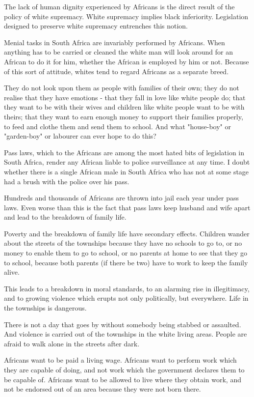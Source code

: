 \documentclass[11pt,a4paper]{article}
\begin{document}
The lack of human dignity experienced by Africans is the direct result of the policy of white
supremacy. White supremacy implies black inferiority. Legislation designed to preserve
white supremacy entrenches this notion.

Menial tasks in South Africa are invariably performed by Africans. When anything has to
be carried or cleaned the white man will look around for an African to do it for him, whether
the African is employed by him or not. Because of this sort of attitude, whites tend to
regard Africans as a separate breed.

They do not look upon them as people with families of their own; they do not realise that
they have emotions - that they fall in love like white people do; that they want to be with
their wives and children like white people want to be with theirs; that they want to earn
enough money to support their families properly, to feed and clothe them and send them to
school. And what "house-boy" or "garden-boy" or labourer can ever hope to do this?

Pass laws, which to the Africans are among the most hated bits of legislation in South
Africa, render any African liable to police surveillance at any time. I doubt whether there is
a single African male in South Africa who has not at some stage had a brush with the
police over his pass.

Hundreds and thousands of Africans are thrown into jail each year under pass laws. Even
worse than this is the fact that pass laws keep husband and wife apart and lead to the
breakdown of family life.

Poverty and the breakdown of family life have secondary effects. Children wander about
the streets of the townships because they have no schools to go to, or no money to enable
them to go to school, or no parents at home to see that they go to school, because both
parents (if there be two) have to work to keep the family alive.

This leads to a breakdown in moral standards, to an alarming rise in illegitimacy, and to
growing violence which erupts not only politically, but everywhere. Life in the townships is
dangerous.

There is not a day that goes by without somebody being stabbed or assaulted. And
violence is carried out of the townships in the white living areas. People are afraid to walk
alone in the streets after dark.

Africans want to be paid a living wage. Africans want to perform work which they are
capable of doing, and not work which the government declares them to be capable of.
Africans want to be allowed to live where they obtain work, and not be endorsed out of an
area because they were not born there.
\end{document}
